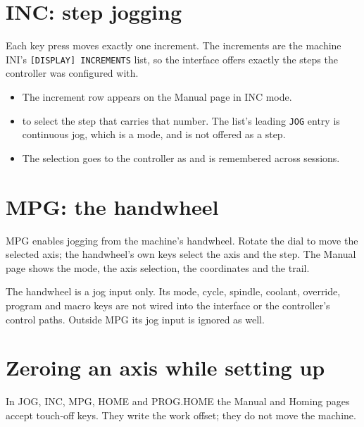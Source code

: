 \section{INC: step jogging}

Each key press moves exactly one increment. The increments are the machine INI's
\texttt{[DISPLAY] INCREMENTS} list, so the interface offers exactly the steps the controller
was configured with.

\begin{itemize}
  \item The increment row appears on the Manual page in INC mode.
  \item {} to  select the step that carries that number. The list's leading
        \texttt{JOG} entry is continuous jog, which is a mode, and is not offered as a step.
  \item The selection goes to the controller as  and is remembered
        across sessions.
\end{itemize}


\section{MPG: the handwheel}

MPG enables jogging from the machine's handwheel. Rotate the dial to move the selected axis;
the handwheel's own keys select the axis and the step. The Manual page shows the mode, the
axis selection, the coordinates and the trail.

\begin{notebox}
  The handwheel is a jog input only. Its mode, cycle, spindle, coolant, override, program
  and macro keys are not wired into the interface or the controller's control paths. Outside
  MPG its jog input is ignored as well.
\end{notebox}

\section{Zeroing an axis while setting up}

In JOG, INC, MPG, HOME and PROG.HOME the Manual and Homing pages accept touch-off keys. They
write the work offset; they do not move the machine.

